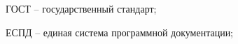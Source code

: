 \newpage
\begin{abbreviations}

ГОСТ -- государственный стандарт;

ЕСПД -- единая система программной документации;

\end{abbreviations}